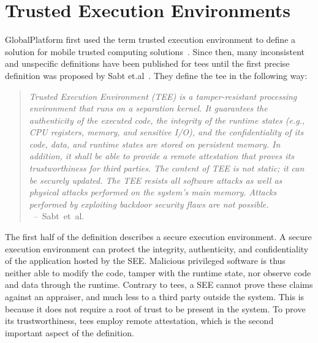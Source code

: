 \section{Trusted Execution Environments}
\label{sec:state:tee}
GlobalPlatform first used the term trusted execution environment to define a
solution for mobile trusted computing solutions~\cite{globaltee}. Since then,
many inconsistent and unspecific definitions have been published for \glspl{tee}
until the first precise definition was proposed by Sabt
et.al~\cite{sabt2015trusted}. They define the \gls{tee} in the following way:
\begin{quote}
  \textit{Trusted Execution Environment (TEE) is a tamper-resistant processing
    environment that runs on a separation kernel. It guarantees the authenticity of
    the executed code, the integrity of the runtime states (e.g., CPU registers,
    memory, and sensitive I/O), and the confidentiality of its code, data, and
    runtime states are stored on persistent memory. In addition, it shall be able
    to provide a remote attestation that proves its trustworthiness for third
    parties. The content of TEE is not static; it can be securely updated. The TEE
    resists all software attacks as well as physical attacks performed on the
    system's main memory. Attacks performed by exploiting backdoor security flaws
    are not possible. \\
  } \mbox{ -- Sabt et al.~\cite{sabt2015trusted}}
\end{quote}

The first half of the definition describes a secure execution environment. A
secure execution environment can protect the integrity, authenticity, and
confidentiality of the application hosted by the SEE. Malicious privileged
software is thus neither able to modify the code, tamper with the runtime state,
nor observe code and data through the runtime. Contrary to \glspl{tee}, a SEE
cannot prove these claims against an appraiser, and much less to a third party
outside the system. This is because it does not require a root of trust to be
present in the system. To prove its trustworthiness, \glspl{tee} employ remote
attestation, which is the second important aspect of the definition.\\

